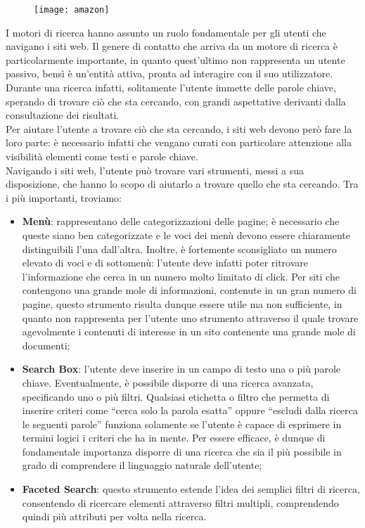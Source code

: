 	\begin{figure}[htbp]
		\begin{center}
			\texttt{[image: amazon]}
		\end{center}
	\end{figure}
	
	I motori di ricerca hanno assunto un ruolo fondamentale per gli utenti che navigano i siti web. Il genere di contatto che arriva da un motore di ricerca è particolarmente importante, in quanto quest'ultimo non rappresenta un utente passivo, bensì è un'entità attiva, pronta ad interagire con il suo utilizzatore. Durante una ricerca infatti, solitamente l'utente immette delle parole chiave, sperando di trovare ciò che sta cercando, con grandi aspettative derivanti dalla consultazione dei risultati. \\
	Per aiutare l'utente a trovare ciò che sta cercando, i siti web devono però fare la loro parte: è necessario infatti che vengano curati con particolare attenzione alla visibilità elementi come testi e parole chiave.\\
	Navigando i siti web, l'utente può trovare vari strumenti, messi a sua disposizione, che hanno lo scopo di aiutarlo a trovare quello che sta cercando. Tra i più importanti, troviamo:
	\begin{itemize}
		\item {\textbf{Menù}: rappresentano delle categorizzazioni delle pagine; è necessario che queste siano ben categorizzate e le voci dei menù devono essere chiaramente distinguibili l'una dall'altra. Inoltre, è fortemente sconsigliato un numero elevato di voci e di sottomenù: l'utente deve infatti poter ritrovare l'informazione che cerca in un numero molto limitato di click. Per siti che contengono una grande mole di informazioni, contenute in un gran numero di pagine, questo strumento risulta dunque essere utile ma non sufficiente, in quanto non rappresenta per l'utente uno strumento attraverso il quale trovare agevolmente i contenuti di interesse in un sito contenente una grande mole di documenti;}
		\item{\textbf{Search Box}: l’utente deve inserire in un campo di testo una o più parole chiave. Eventualmente, è possibile disporre di una ricerca avanzata, specificando uno o più filtri. Qualsiasi etichetta o filtro che permetta di inserire criteri come “cerca solo la parola esatta” oppure “escludi dalla ricerca le seguenti parole” funziona solamente se l’utente è capace di esprimere in termini logici i criteri che ha in mente. Per essere efficace, è dunque di fondamentale importanza disporre di una ricerca che sia il più possibile in grado di comprendere il linguaggio naturale dell'utente;}
		\item{\textbf{Faceted Search}: questo strumento estende l'idea dei semplici filtri di ricerca, consentendo di ricercare elementi attraverso filtri multipli, comprendendo quindi più attributi per volta nella ricerca.}
	\end{itemize}
	
